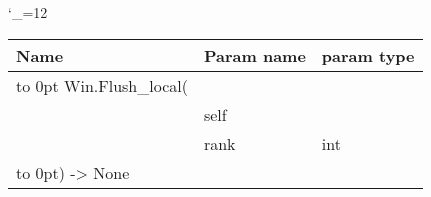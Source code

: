 \begingroup \catcode`\_=12 \tt
\begin{tabular}{lll}
\toprule
\textrm{Name}&\textrm{Param name}&\textrm{param type}\\
\midrule
\hbox to 0pt {Win.Flush_local(\hss}\\
& self\\
& rank & int\\
\hbox to 0pt{) -> None\hss}\\
\bottomrule
\end{tabular}
\endgroup
